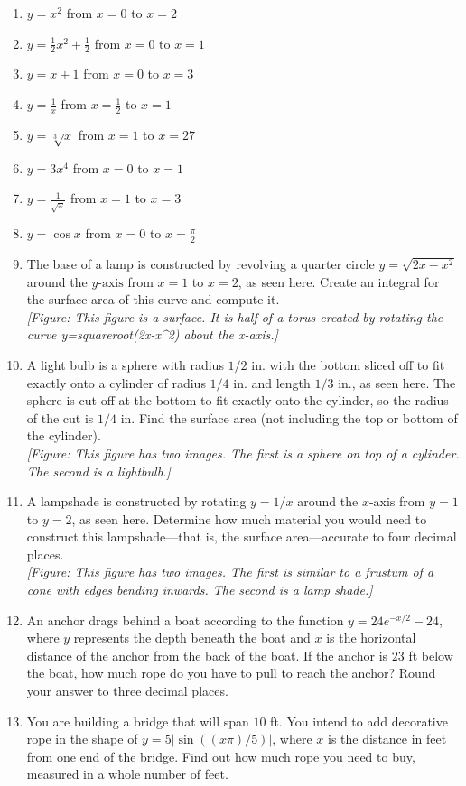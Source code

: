 \documentclass{exercises}
\begin{document}
\begin{enumerate}[resume]
\item $y=x^{2}$ from $x=0$ to $x=2$
\item $y=\frac{1}{2}x^{2}+\frac{1}{2}$ from $x=0$ to $x=1$
\item $y=x+1$ from $x=0$ to $x=3$
\item \techrequired $y=\frac{1}{x}$ from $x=\frac{1}{2}$ to $x=1$
\item $y=\sqrt[3]{x}$ from $x=1$ to $x=27$
\item \techrequired $y=3x^{4}$ from $x=0$ to $x=1$
\item \techrequired $y=\frac{1}{\sqrt{x}}$ from $x=1$ to $x=3$
\item \techrequired $y=\cos x$ from $x=0$ to $x=\frac{\pi}{2}$
\item The base of a lamp is constructed by revolving a quarter circle $y=\sqrt{2x-x^{2}}$ around the $y\text{-axis}$ from $x=1$ to $x=2$, as seen here. Create an integral for the surface area of this curve and compute it. \\ \textit{[Figure: This figure is a surface. It is half of a torus created by rotating the curve y=squareroot(2x-x\textasciicircum{}2) about the x-axis.]}
\item A light bulb is a sphere with radius $1/2$ in. with the bottom sliced off to fit exactly onto a cylinder of radius $1/4$ in. and length $1/3$ in., as seen here. The sphere is cut off at the bottom to fit exactly onto the cylinder, so the radius of the cut is $1/4$ in. Find the surface area (not including the top or bottom of the cylinder). \\ \textit{[Figure: This figure has two images. The first is a sphere on top of a cylinder. The second is a lightbulb.]}
\item \techrequired A lampshade is constructed by rotating $y=1/x$ around the $x\text{-axis}$ from $y=1$ to $y=2$, as seen here. Determine how much material you would need to construct this lampshade---that is, the surface area---accurate to four decimal places. \\ \textit{[Figure: This figure has two images. The first is similar to a frustum of a cone with edges bending inwards. The second is a lamp shade.]}
\item \techrequired An anchor drags behind a boat according to the function $y=24e^{-x/2}-24$, where $y$ represents the depth beneath the boat and $x$ is the horizontal distance of the anchor from the back of the boat. If the anchor is $23$ ft below the boat, how much rope do you have to pull to reach the anchor? Round your answer to three decimal places.
\item \techrequired You are building a bridge that will span $10$ ft. You intend to add decorative rope in the shape of $y=5|\sin((x\pi)/5)|$, where $x$ is the distance in feet from one end of the bridge. Find out how much rope you need to buy, measured in a whole number of feet.
\end{enumerate}
\end{document}
